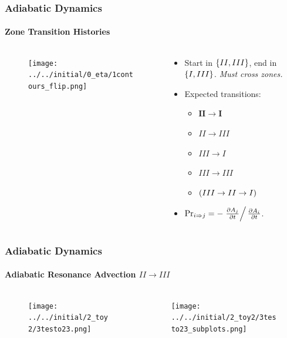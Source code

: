\documentclass[dvipsnames]{beamer}
\newcommand*{\pd}[2]{\frac{\partial#1}{\partial#2}}
\DeclarePairedDelimiter\p{\lparen}{\rparen}
\DeclarePairedDelimiter\z{\lbrace}{\rbrace}
\begin{document}
\begin{frame}
    \frametitle{Adiabatic Dynamics}
    \framesubtitle{Zone Transition Histories}

    \begin{columns}
        \begin{column}{0.5\textwidth}
            \begin{figure}
                \centering
                \texttt{[image: ../../initial/0\_eta/1contours\_flip.png]}
            \end{figure}
        \end{column}
        \begin{column}{0.5\textwidth}
            \begin{itemize}
                \item Start in $\z*{II, III}$, end in $\z*{I, III}$.
                    \emph{Must cross zones.}

                \item Expected transitions:
                    \begin{itemize}
                        \item $\mathbf{II \to I}$
                        \item $II \to III$
                        \item $III \to I$
                        \item $III \to III$
                        \item $\p*{III \to II \to I}$
                    \end{itemize}

                \item $\Pr_{i \Rightarrow j} =
                    -\left. \pd{A_j}{t} \right/ \pd{A_i}{t}$.
            \end{itemize}
        \end{column}
    \end{columns}
\end{frame}

\begin{frame}
    \frametitle{Adiabatic Dynamics}
    \framesubtitle{Adiabatic Resonance Advection $II \to III$}

    \begin{columns}
        \begin{column}{0.5\textwidth}
            \begin{figure}[t]
                \centering
                \texttt{[image: ../../initial/2\_toy2/3testo23.png]}
            \end{figure}
        \end{column}
        \begin{column}{0.5\textwidth}
            \begin{figure}[t]
                \centering
                \texttt{[image: ../../initial/2\_toy2/3testo23\_subplots.png]}
            \end{figure}
        \end{column}
    \end{columns}
\end{frame}
\end{document}
